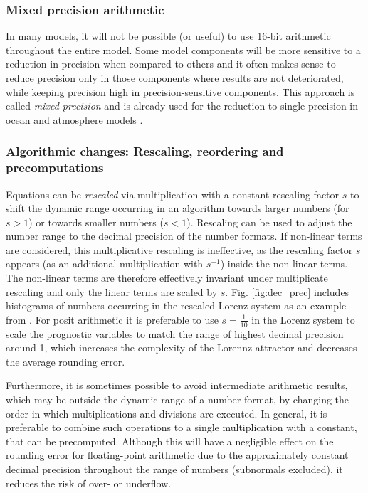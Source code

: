 \documentclass[draft]{agujournal2019}
\begin{document}
\subsubsection{Mixed precision arithmetic}

In many models, it will not be possible (or useful) to use 16-bit arithmetic
throughout the entire model. Some model components will be more sensitive to a
reduction in precision when compared to others and it often makes sense to reduce
precision only in those components where results are not deteriorated, while
keeping precision high in precision-sensitive components. This approach is
called \emph{mixed-precision} and is already used for the reduction to single
precision in ocean and atmosphere models \cite{Vana2017,TintoPrims2019}.

\subsubsection{Algorithmic changes: Rescaling, reordering and precomputations}

Equations can be \emph{rescaled} via multiplication with a constant rescaling
factor $s$ to shift the dynamic range occurring in an algorithm towards larger
numbers (for $s > 1$) or towards smaller numbers ($s < 1$). Rescaling can be used
to adjust the number range to the decimal precision of the number formats. If
non-linear terms are considered, this multiplicative rescaling is ineffective,
as the rescaling factor $s$ appears (as an additional multiplication with $s^{-1}$)
inside the non-linear terms. The non-linear terms are therefore effectively invariant
under multiplicate rescaling and only the linear terms are scaled by $s$.
Fig. \ref{fig:dec_prec} includes histograms of numbers occurring in the rescaled
Lorenz system \cite{Lorenz1963,Kwasniok2014,Jeffress2017,Tantet2018} as an example
from . For posit arithmetic it is preferable to use
$s=\tfrac{1}{10}$ in the Lorenz system to scale the prognostic variables
to match the range of highest decimal precision around 1, which increases the
complexity of the Lorennz attractor and decreases the average rounding error.

Furthermore, it is sometimes possible to avoid intermediate arithmetic results,
which may be outside the dynamic range of a number format, by changing the order
in which multiplications and divisions are executed. In general, it is preferable
to combine such operations to a single multiplication with a constant, that can
be precomputed. Although this will have a negligible effect on the rounding error
for floating-point arithmetic due to the approximately constant decimal precision
throughout the range of numbers (subnormals excluded), it reduces the risk of
over- or underflow.
\end{document}
